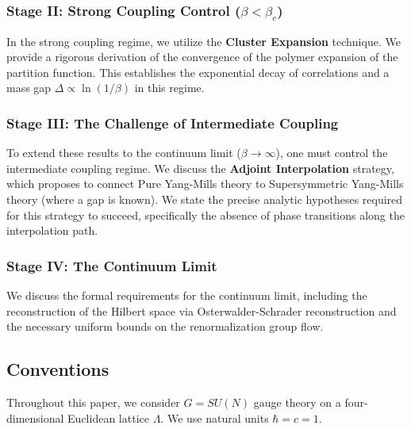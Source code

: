 \subsubsection*{Stage II: Strong Coupling Control ($\beta < \beta_c$)}
In the strong coupling regime, we utilize the \textbf{Cluster Expansion} technique. We provide a rigorous derivation of the convergence of the polymer expansion of the partition function. This establishes the exponential decay of correlations and a mass gap $\Delta \propto \ln(1/\beta)$ in this regime.

\subsubsection*{Stage III: The Challenge of Intermediate Coupling}
To extend these results to the continuum limit ($\beta \to \infty$), one must control the intermediate coupling regime. We discuss the \textbf{Adjoint Interpolation} strategy, which proposes to connect Pure Yang-Mills theory to Supersymmetric Yang-Mills theory (where a gap is known). We state the precise analytic hypotheses required for this strategy to succeed, specifically the absence of phase transitions along the interpolation path.

\subsubsection*{Stage IV: The Continuum Limit}
We discuss the formal requirements for the continuum limit, including the reconstruction of the Hilbert space via Osterwalder-Schrader reconstruction and the necessary uniform bounds on the renormalization group flow.

\subsection{Conventions}
Throughout this paper, we consider $G=SU(N)$ gauge theory on a four-dimensional Euclidean lattice $\Lambda$. We use natural units $\hbar = c = 1$.
